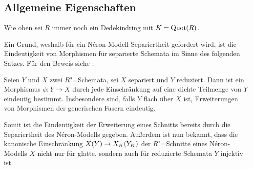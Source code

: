 \subsection{Allgemeine Eigenschaften}
Wie oben sei $R$ immer noch ein Dedekindring mit $K=\operatorname{Quot}(R)$.

Ein Grund, weshalb für ein Néron-Modell Separiertheit gefordert wird,
ist die Eindeutigkeit von Morphismen für separierte Schemata im Sinne
des folgenden Satzes. Für den Beweis siehe
\cite[Corollary~9.9]{wedhorn}.
\begin{Satz}\label{thm:erweindeutig}
  Seien $Y$ und $X$ zwei $R$"=Schemata, sei $X$ separiert und $Y$
  reduziert.
  Dann ist ein Morphismus $\phi\colon Y\to X$ durch jede
  Einschränkung auf eine dichte Teilmenge von $Y$ eindeutig bestimmt.
  Insbesondere sind, falls $Y$ flach über $X$ ist, Erweiterungen von
  Morphismen der generischen Fasern eindeutig.

\end{Satz}
Somit ist die Eindeutigkeit der Erweiterung eines Schnitts bereits
durch die Separiertheit des Néron-Modells gegeben. Außerdem ist nun
bekannt, dass die kanonische Einschränkung $X(Y)\to X_{K}(Y_{K})$ der
$R$"=Schnitte eines Néron-Modells $X$ nicht nur für glatte, sondern
auch für reduzierte Schemata $Y$ injektiv ist.

